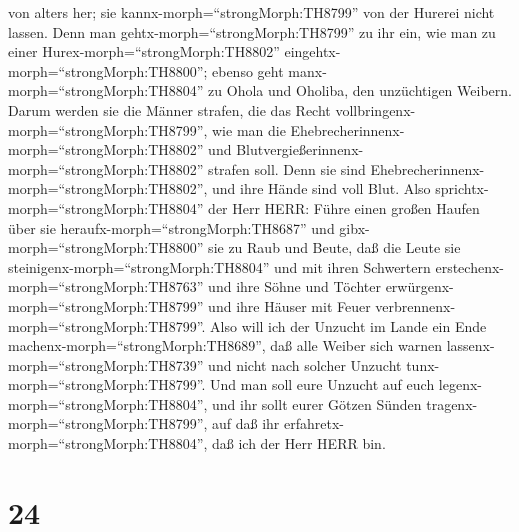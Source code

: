 von alters her; sie kannx-morph=``strongMorph:TH8799'' von der Hurerei
nicht lassen.  Denn man gehtx-morph=``strongMorph:TH8799''
zu ihr ein, wie man zu einer Hurex-morph=``strongMorph:TH8802''
eingehtx-morph=``strongMorph:TH8800''; ebenso geht
manx-morph=``strongMorph:TH8804'' zu Ohola und Oholiba, den unzüchtigen
Weibern.  Darum werden sie die Männer strafen, die das
Recht vollbringenx-morph=``strongMorph:TH8799'', wie man die
Ehebrecherinnenx-morph=``strongMorph:TH8802'' und
Blutvergießerinnenx-morph=``strongMorph:TH8802'' strafen soll. Denn sie
sind Ehebrecherinnenx-morph=``strongMorph:TH8802'', und ihre Hände sind
voll Blut.  Also sprichtx-morph=``strongMorph:TH8804'' der
Herr HERR: Führe einen großen Haufen über sie
heraufx-morph=``strongMorph:TH8687'' und
gibx-morph=``strongMorph:TH8800'' sie zu Raub und Beute, 
daß die Leute sie steinigenx-morph=``strongMorph:TH8804'' und mit ihren
Schwertern erstechenx-morph=``strongMorph:TH8763'' und ihre Söhne und
Töchter erwürgenx-morph=``strongMorph:TH8799'' und ihre Häuser mit Feuer
verbrennenx-morph=``strongMorph:TH8799''.  Also will ich
der Unzucht im Lande ein Ende machenx-morph=``strongMorph:TH8689'', daß
alle Weiber sich warnen lassenx-morph=``strongMorph:TH8739'' und nicht
nach solcher Unzucht tunx-morph=``strongMorph:TH8799''. 
Und man soll eure Unzucht auf euch legenx-morph=``strongMorph:TH8804'',
und ihr sollt eurer Götzen Sünden tragenx-morph=``strongMorph:TH8799'',
auf daß ihr erfahretx-morph=``strongMorph:TH8804'', daß ich der Herr
HERR bin.

\hypertarget{section-23}{%
\section{24}\label{section-23}}

